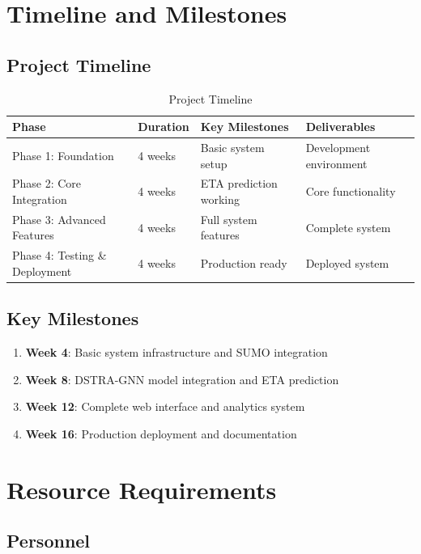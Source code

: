 \documentclass[12pt,a4paper]{article}
\begin{document}
\section{Timeline and Milestones}

\subsection{Project Timeline}

\begin{table}[h]
\centering
\begin{tabular}{|l|l|l|l|}
\hline
\textbf{Phase} & \textbf{Duration} & \textbf{Key Milestones} & \textbf{Deliverables} \\
\hline
Phase 1: Foundation & 4 weeks & Basic system setup & Development environment \\
Phase 2: Core Integration & 4 weeks & ETA prediction working & Core functionality \\
Phase 3: Advanced Features & 4 weeks & Full system features & Complete system \\
Phase 4: Testing \& Deployment & 4 weeks & Production ready & Deployed system \\
\hline
\end{tabular}
\caption{Project Timeline}
\label{tab:timeline}
\end{table}

\subsection{Key Milestones}

\begin{enumerate}
    \item \textbf{Week 4}: Basic system infrastructure and SUMO integration
    \item \textbf{Week 8}: DSTRA-GNN model integration and ETA prediction
    \item \textbf{Week 12}: Complete web interface and analytics system
    \item \textbf{Week 16}: Production deployment and documentation
\end{enumerate}

\section{Resource Requirements}

\subsection{Personnel}
\end{document}
